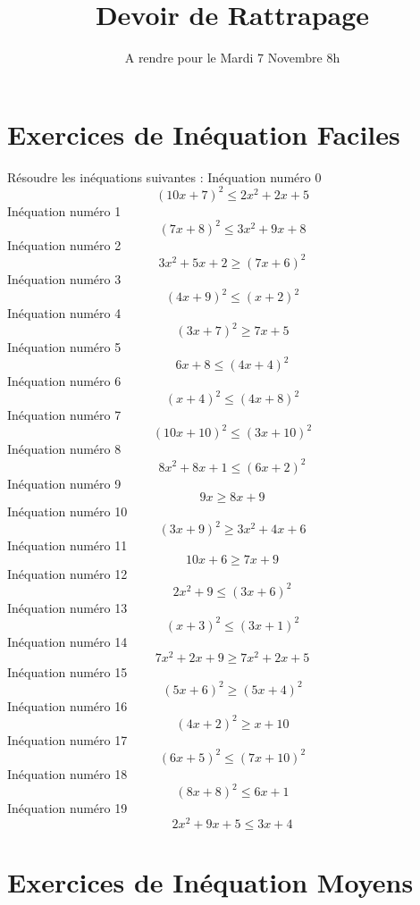 \documentclass{article}
\title{Devoir de Rattrapage}
\date{A rendre pour le Mardi 7 Novembre 8h}\usepackage{natbib}
\begin{document}
\maketitle
 \section{Exercices de In\'equation Faciles}

 R\'esoudre les in\'equations suivantes : 
In\'equation num\'ero 0 \[\left(10 x + 7\right)^{2} \leq 2 x^{2} + 2 x + 5\]In\'equation num\'ero 1 \[\left(7 x + 8\right)^{2} \leq 3 x^{2} + 9 x + 8\]In\'equation num\'ero 2 \[3 x^{2} + 5 x + 2 \geq \left(7 x + 6\right)^{2}\]In\'equation num\'ero 3 \[\left(4 x + 9\right)^{2} \leq \left(x + 2\right)^{2}\]In\'equation num\'ero 4 \[\left(3 x + 7\right)^{2} \geq 7 x + 5\]In\'equation num\'ero 5 \[6 x + 8 \leq \left(4 x + 4\right)^{2}\]In\'equation num\'ero 6 \[\left(x + 4\right)^{2} \leq \left(4 x + 8\right)^{2}\]In\'equation num\'ero 7 \[\left(10 x + 10\right)^{2} \leq \left(3 x + 10\right)^{2}\]In\'equation num\'ero 8 \[8 x^{2} + 8 x + 1 \leq \left(6 x + 2\right)^{2}\]In\'equation num\'ero 9 \[9 x \geq 8 x + 9\]In\'equation num\'ero 10 \[\left(3 x + 9\right)^{2} \geq 3 x^{2} + 4 x + 6\]In\'equation num\'ero 11 \[10 x + 6 \geq 7 x + 9\]In\'equation num\'ero 12 \[2 x^{2} + 9 \leq \left(3 x + 6\right)^{2}\]In\'equation num\'ero 13 \[\left(x + 3\right)^{2} \leq \left(3 x + 1\right)^{2}\]In\'equation num\'ero 14 \[7 x^{2} + 2 x + 9 \geq 7 x^{2} + 2 x + 5\]In\'equation num\'ero 15 \[\left(5 x + 6\right)^{2} \geq \left(5 x + 4\right)^{2}\]In\'equation num\'ero 16 \[\left(4 x + 2\right)^{2} \geq x + 10\]In\'equation num\'ero 17 \[\left(6 x + 5\right)^{2} \leq \left(7 x + 10\right)^{2}\]In\'equation num\'ero 18 \[\left(8 x + 8\right)^{2} \leq 6 x + 1\]In\'equation num\'ero 19 \[2 x^{2} + 9 x + 5 \leq 3 x + 4\]
 \section{Exercices de In\'equation Moyens}
\end{document}
